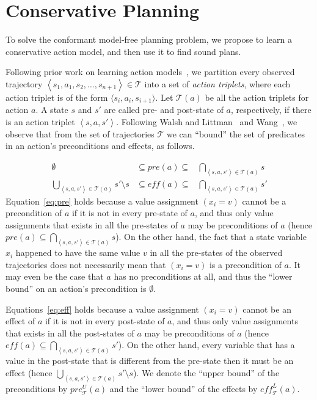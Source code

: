 \documentclass{article}
\newcommand{\tuple}[1]{\ensuremath{\left \langle #1 \right \rangle }}
\newcommand{\eff}{\textit{eff}}
\newcommand{\pre}{\textit{pre}}
\begin{document}
	
	\section{Conservative Planning}
	To solve the conformant model-free planning problem, we propose to learn a conservative action model, and then use it to find sound plans.
	
	Following prior work on learning action models~\cite{wang1995learning,wang1994learning,walsh2008efficientLearning}, we partition every observed trajectory $\tuple{s_1,a_1,s_2,\ldots,s_{n+1}}\in\mathcal{T}$ into a set of {\em action triplets}, where each action triplet is of the form $\langle s_i, a_i, s_{i+1}\rangle$. 
	Let $\mathcal{T}(a)$ be all the action triplets for action $a$. 
	A state $s$ and $s'$ are called pre- and post-state of $a$, respectively, if there is an action triplet $\tuple{s,a,s'}$. Following Walsh and Littman~ and Wang~, we observe that from the set of trajectories $\mathcal{T}$ we can ``bound'' the set of predicates in an action's preconditions and effects, as follows. 
	
	\begin{align}
	\emptyset & \subseteq \pre(a) \subseteq & \bigcap_{\tuple{s, a, s'}\in \mathcal{T}(a)} s \label{eq:pre} \\
	\bigcup_{\tuple{s, a, s'}\in \mathcal{T}(a)} s'\setminus s &
	\subseteq \eff(a) \subseteq &
	\bigcap_{\tuple{s, a, s'}\in \mathcal{T}(a)} s'
	\label{eq:eff}
	\end{align}
	Equation~\ref{eq:pre} holds because a value assignment $(x_i=v)$ cannot be a precondition of $a$ if it is not in every pre-state of $a$, and thus only value assignments that 
	exists in all the pre-states of $a$ may be preconditions of $a$ (hence $\pre(a)\subseteq \bigcap_{\tuple{s, a, s'}\in \mathcal{T}(a)} s$).     On the other hand, the fact that a state variable $x_i$ happened to have the same value $v$ in all the pre-states of the observed trajectories does not necessarily mean that $(x_i=v)$ is a precondition of $a$. It may even be the case that $a$ has no preconditions at all, and thus the ``lower bound'' on an action's precondition is $\emptyset$. 
	
	Equations~\ref{eq:eff} holds because a value assignment $(x_i=v)$ cannot be an effect of $a$ if it is not in every post-state of $a$, and thus only value assignments that 
	exists in all the post-states of $a$ may be preconditions of $a$ (hence $\eff(a)\subseteq \bigcap_{\tuple{s, a, s'}\in \mathcal{T}(a)} s'$). On the other hand, every variable that has a value in the post-state that is different from the pre-state then it must be an effect (hence $\bigcup_{\tuple{s, a, s'}\in \mathcal{T}(a)} s'\setminus s$).
	We denote the ``upper bound'' of the preconditions by $\pre_\mathcal{T}^U(a)$ 
	and the ``lower bound'' of the effects by $\eff_\mathcal{T}^L(a)$. 
	
\end{document}
